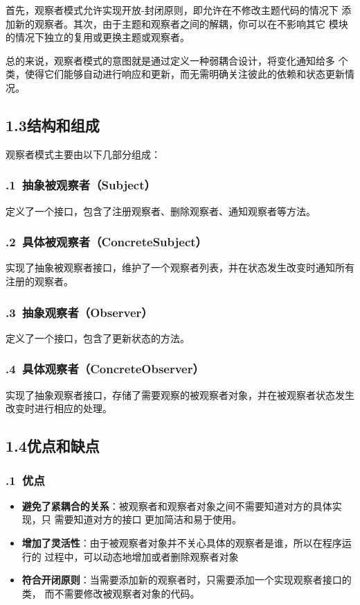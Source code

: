 \documentclass[24pt,a4paper]{article}%
\begin{document}
首先，观察者模式允许实现开放-封闭原则，即允许在不修改主题代码的情况下
添加新的观察者。其次，由于主题和观察者之间的解耦，你可以在不影响其它
模块的情况下独立的复用或更换主题或观察者。

总的来说，观察者模式的意图就是通过定义一种弱耦合设计，将变化通知给多
个类，使得它们能够自动进行响应和更新，而无需明确关注彼此的依赖和状态更新情况。
\subsection*{\songti 1.3结构和组成}
观察者模式主要由以下几部分组成：
\subsubsection*{.1\ 抽象被观察者（Subject）}
定义了一个接口，包含了注册观察者、删除观察者、通知观察者等方法。
\subsubsection*{.2\ 具体被观察者（ConcreteSubject）}
实现了抽象被观察者接口，维护了一个观察者列表，并在状态发生改变时通知所有注册的观察者。
\subsubsection*{.3\ 抽象观察者（Observer）}
定义了一个接口，包含了更新状态的方法。
\subsubsection*{.4\ 具体观察者（ConcreteObserver）}
实现了抽象观察者接口，存储了需要观察的被观察者对象，并在被观察者状态发生改变时进行相应的处理。
\subsection*{\songti 1.4优点和缺点}

\subsubsection*{.1\ 优点}
\begin{itemize}
    \item \textbf{避免了紧耦合的关系}：被观察者和观察者对象之间不需要知道对方的具体实现，只
    需要知道对方的接口
    更加简洁和易于使用。
    \item \textbf{增加了灵活性}：由于被观察者对象并不关心具体的观察者是谁，所以在程序运行的
    过程中，可以动态地增加或者删除观察者对象
    \item \textbf{符合开闭原则}：当需要添加新的观察者时，只需要添加一个实现观察者接口的类，
    而不需要修改被观察者对象的代码。
\end{itemize}
\end{document}
